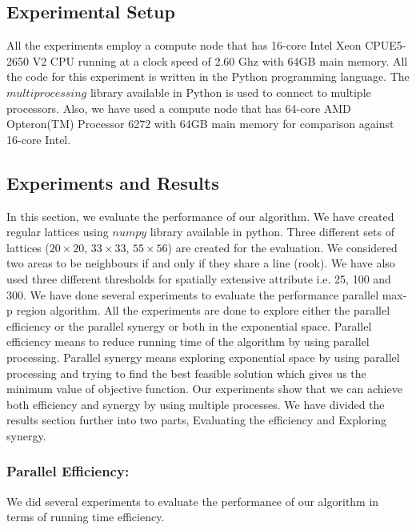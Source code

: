\documentclass[conference]{IEEEtran}
\begin{document}
\subsection{Experimental Setup}
All the experiments employ a compute node that has 16-core Intel Xeon
CPUE5-2650 V2 CPU running at a clock speed of 2.60 Ghz with 64GB main memory.
All the code for this experiment is written in the Python programming language.
The $multiprocessing$ library available in Python is used to connect to multiple
processors. Also, we have used a compute node that has 64-core AMD Opteron(TM)
Processor 6272 with 64GB main memory for comparison against 16-core Intel.

\subsection{Experiments and Results}

In this section, we evaluate the performance of our algorithm. We have created
regular lattices using $numpy$ library available in python. Three different sets
of lattices ($20\times 20$, $33\times 33$, $55\times 56$) are created for the
evaluation. We considered two areas to be neighbours if and only if they share a
line (rook). We have also used three different thresholds for spatially
extensive attribute i.e. 25, 100 and 300. We have done several experiments to
evaluate the performance parallel max-p region algorithm. All the experiments are done to explore either the parallel efficiency or the parallel synergy or both in the exponential space. Parallel efficiency means to reduce running time of the algorithm by using parallel processing. Parallel synergy means exploring exponential space by using parallel processing and trying to find the best feasible solution which gives us the minimum value of objective function. Our experiments show that we can achieve both efficiency and synergy by using multiple processes. We have divided the results section further into two parts, Evaluating the efficiency and Exploring synergy.

\subsubsection{Parallel Efficiency:}

We did several experiments to evaluate the performance of our algorithm in terms of running time efficiency. 
\end{document}
